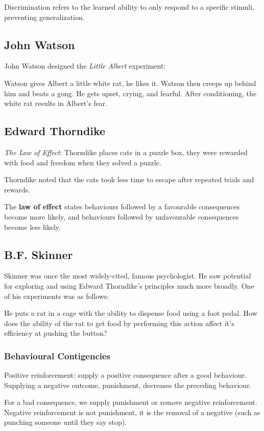 \documentclass[12pt]{article}
\begin{document}
Discrimination refers to the learned ability to only respond to a specific stimuli, preventing generalization.

\subsection*{John Watson}
John Watson designed the {\it Little Albert} experiment:

Watson gives Albert a little white rat, he likes it. Watson then creeps up behind him and beats a gong. He gets upset, crying, and fearful. After conditioning, the white rat results in Albert's fear.

\subsection*{Edward Thorndike}
\textit{The Law of Effect}: Thorndike places cats in a puzzle box, they were rewarded with food and freedom when they solved a puzzle.

Thorndike noted that the cats took less time to escape after repeated trials and rewards.

The \textbf{law of effect} states behaviours followed by a favourable consequences become more likely, and behaviours followed by unfavourable consequences become less likely.

\subsection*{B.F. Skinner}
Skinner was once the most widely-cited, famous psychologist. He saw potential for exploring and using Edward Thorndike's principles much more broadly. One of his experiments was as follows:

He puts a rat in a cage with the ability to dispense food using a foot pedal. How does the ability of the rat to get food by performing this action affect it's efficiency at pushing the button?

\subsubsection*{Behavioural Contigencies}
Positive reinforcement: supply a positive consequence after a good behaviour. Supplying a negative outcome, punishment, decreases the preceding behaviour.

For a bad consequence, we supply punishment or remove negative reinforcement. Negative reinforcement is not punishment, it is the removal of a negative (such as punching someone until they say stop).
\end{document}
